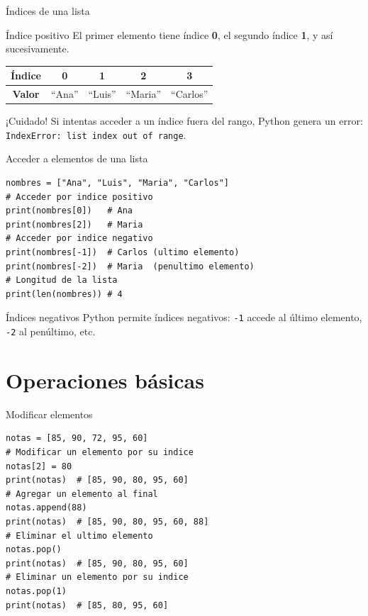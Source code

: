 \documentclass[aspectratio=169,xcolor=dvipsnames]{beamer}
\begin{document}
\begin{frame}{Índices de una lista}
    \begin{block}{Índice positivo}
        El primer elemento tiene índice \textbf{0}, el segundo índice \textbf{1}, y así sucesivamente.
    \end{block}
    \vspace{0.3cm}
    \begin{center}
    \begin{tabular}{ccccc}
        \toprule
        \textbf{Índice} & 0 & 1 & 2 & 3 \\
        \midrule
        \textbf{Valor}  & ``Ana'' & ``Luis'' & ``Maria'' & ``Carlos'' \\
        \bottomrule
    \end{tabular}
    \end{center}
    \vspace{0.3cm}
    \begin{alertblock}{¡Cuidado!}
        Si intentas acceder a un índice fuera del rango, Python genera un error: \texttt{IndexError: list index out of range}.
    \end{alertblock}
\end{frame}

\begin{frame}[fragile]{Acceder a elementos de una lista}
\begin{lstlisting}[style=PythonStyle]
nombres = ["Ana", "Luis", "Maria", "Carlos"]
# Acceder por indice positivo
print(nombres[0])   # Ana
print(nombres[2])   # Maria
# Acceder por indice negativo
print(nombres[-1])  # Carlos (ultimo elemento)
print(nombres[-2])  # Maria  (penultimo elemento)
# Longitud de la lista
print(len(nombres)) # 4
\end{lstlisting}
    \begin{exampleblock}{Índices negativos}
        Python permite índices negativos: \texttt{-1} accede al último elemento, \texttt{-2} al penúltimo, etc.
    \end{exampleblock}
\end{frame}

\section{Operaciones básicas}

\begin{frame}[fragile]{Modificar elementos}
\begin{lstlisting}[style=PythonStyle]
notas = [85, 90, 72, 95, 60]
# Modificar un elemento por su indice
notas[2] = 80
print(notas)  # [85, 90, 80, 95, 60]
# Agregar un elemento al final
notas.append(88)
print(notas)  # [85, 90, 80, 95, 60, 88]
# Eliminar el ultimo elemento
notas.pop()
print(notas)  # [85, 90, 80, 95, 60]
# Eliminar un elemento por su indice
notas.pop(1)
print(notas)  # [85, 80, 95, 60]
\end{lstlisting}
\end{frame}
\end{document}
